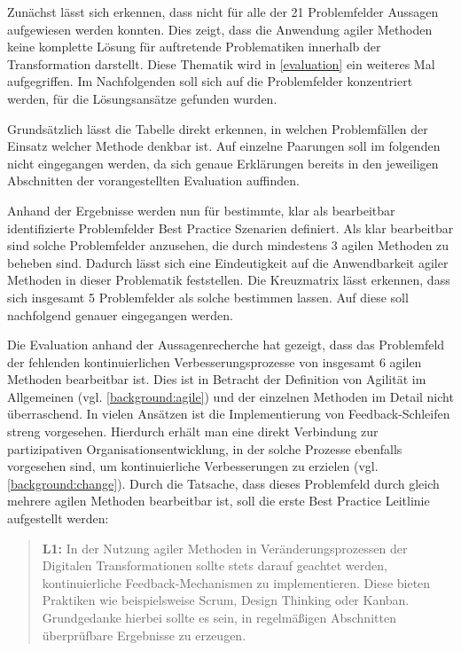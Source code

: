Zunächst lässt sich erkennen, dass nicht für alle der 21 Problemfelder Aussagen aufgewiesen werden konnten. Dies zeigt, dass die Anwendung agiler Methoden keine komplette Lösung für auftretende Problematiken innerhalb der Transformation darstellt. Diese Thematik wird in \ref{evaluation} ein weiteres Mal aufgegriffen. Im Nachfolgenden soll sich auf die Problemfelder konzentriert werden, für die Lösungsansätze gefunden wurden. 

Grundsätzlich lässt die Tabelle direkt erkennen, in welchen Problemfällen der Einsatz welcher Methode denkbar ist. Auf einzelne  Paarungen soll im folgenden nicht eingegangen werden, da sich genaue Erklärungen bereits in den jeweiligen Abschnitten der vorangestellten Evaluation auffinden.

Anhand der Ergebnisse werden nun für bestimmte, klar als bearbeitbar identifizierte Problemfelder Best Practice Szenarien definiert. Als klar bearbeitbar sind solche Problemfelder anzusehen, die durch mindestens 3 agilen Methoden zu beheben sind. Dadurch lässt sich eine Eindeutigkeit auf die Anwendbarkeit agiler Methoden in dieser Problematik feststellen. Die Kreuzmatrix lässt erkennen, dass sich insgesamt 5 Problemfelder als solche bestimmen lassen. Auf diese soll nachfolgend genauer eingegangen werden.

Die Evaluation anhand der Aussagenrecherche hat gezeigt, dass das Problemfeld der fehlenden kontinuierlichen Verbesserungsprozesse von insgesamt 6 agilen Methoden bearbeitbar ist. Dies ist in Betracht der Definition von Agilität im Allgemeinen (vgl. \ref{background:agile}) und der einzelnen Methoden im Detail nicht überraschend. In vielen Ansätzen ist die Implementierung von Feedback-Schleifen streng vorgesehen. Hierdurch erhält man eine direkt Verbindung zur partizipativen Organisationsentwicklung, in der solche Prozesse ebenfalls vorgesehen sind, um kontinuierliche Verbesserungen zu erzielen (vgl. \ref{background:change}). Durch die Tatsache, dass dieses Problemfeld durch gleich mehrere agilen Methoden bearbeitbar ist, soll die erste Best Practice Leitlinie aufgestellt werden:

\begin{quote}
	\textbf{L1:} In der Nutzung agiler Methoden in Veränderungsprozessen der Digitalen Transformationen sollte stets darauf geachtet werden, kontinuierliche Feedback-Mechanismen zu implementieren. Diese bieten Praktiken wie beispielsweise Scrum, Design Thinking oder Kanban. Grundgedanke hierbei sollte es sein, in regelmäßigen Abschnitten überprüfbare Ergebnisse zu erzeugen.
\end{quote}

